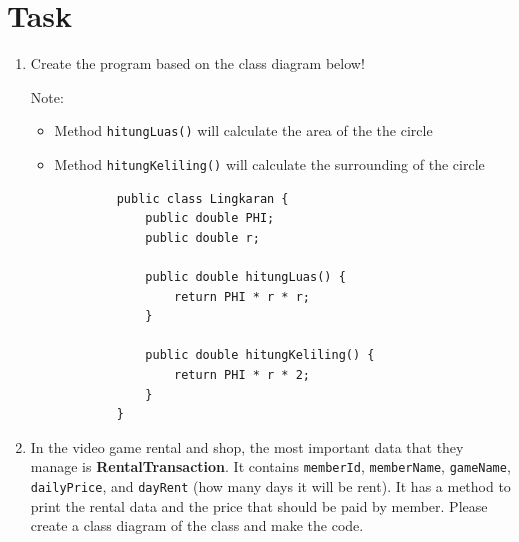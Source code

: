\documentclass[12pt,titlepage]{article}
\begin{document}
\renewcommand{\umldrawcolor}{black}
\renewcommand{\umlfillcolor}{white}

\newpage

\section{Task}
\begin{enumerate}
    \item {
        Create the program based on the class diagram below!


        Note:
        \begin{itemize}
            \item Method \texttt{hitungLuas()} will calculate the area of the the circle
            \item Method \texttt{hitungKeliling()} will calculate the surrounding of the circle
        \end{itemize}

        \begin{verbatim}
            public class Lingkaran {
                public double PHI;
                public double r;

                public double hitungLuas() {
                    return PHI * r * r;
                }

                public double hitungKeliling() {
                    return PHI * r * 2;
                }
            }
        \end{verbatim}
    }
    \item {
        In the video game rental and shop, the most important data that they manage is \textbf{RentalTransaction}.
        It contains \texttt{memberId}, \texttt{memberName}, \texttt{gameName}, \texttt{dailyPrice}, and \texttt{dayRent} (how many days it will be rent).
        It has a method to print the rental data and the price that should be paid by member. Please create a class diagram of the class and make the code.

}
\end{enumerate}
\end{document}
